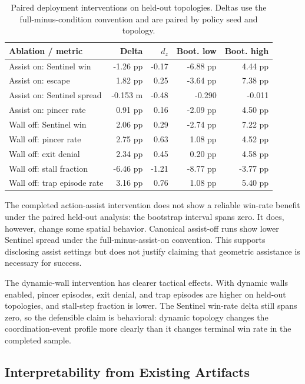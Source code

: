 \documentclass[journal]{IEEEtran}
\begin{document}
\begin{table}[t]
\centering
\caption{Paired deployment interventions on held-out topologies. Deltas use
the full-minus-condition convention and are paired by policy seed and topology.}
\label{tab:deployment_interventions}
\scriptsize
\setlength{\tabcolsep}{3pt}
\begin{tabular}{lrrrr}
\toprule
Ablation / metric & Delta & $d_z$ & Boot. low & Boot. high \\
\midrule
Assist on: Sentinel win & -1.26 pp & -0.17 & -6.88 pp & 4.44 pp \\
Assist on: escape & 1.82 pp & 0.25 & -3.64 pp & 7.38 pp \\
Assist on: Sentinel spread & -0.153 m & -0.48 & -0.290 & -0.011 \\
Assist on: pincer rate & 0.91 pp & 0.16 & -2.09 pp & 4.50 pp \\
\midrule
Wall off: Sentinel win & 2.06 pp & 0.29 & -2.74 pp & 7.22 pp \\
Wall off: pincer rate & 2.75 pp & 0.63 & 1.08 pp & 4.52 pp \\
Wall off: exit denial & 2.34 pp & 0.45 & 0.20 pp & 4.58 pp \\
Wall off: stall fraction & -6.46 pp & -1.21 & -8.77 pp & -3.77 pp \\
Wall off: trap episode rate & 3.16 pp & 0.76 & 1.08 pp & 5.40 pp \\
\bottomrule
\end{tabular}
\end{table}

The completed action-assist intervention does not show a reliable win-rate
benefit under the paired held-out analysis: the bootstrap interval spans zero.
It does, however, change some spatial behavior. Canonical assist-off runs show
lower Sentinel spread under the full-minus-assist-on convention. This supports
disclosing assist settings but does not justify claiming that geometric
assistance is necessary for success.

The dynamic-wall intervention has clearer tactical effects. With dynamic walls
enabled, pincer episodes, exit denial, and trap episodes are higher on held-out
topologies, and stall-step fraction is lower. The Sentinel win-rate delta still
spans zero, so the defensible claim is behavioral: dynamic topology changes the
coordination-event profile more clearly than it changes terminal win rate in
the completed sample.

\subsection{Interpretability from Existing Artifacts}
\end{document}
